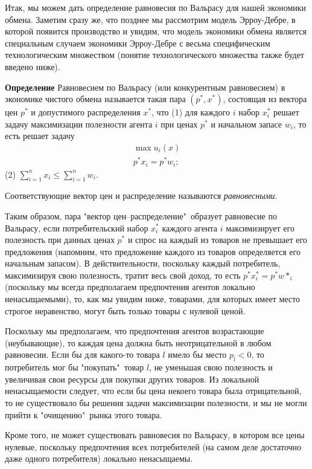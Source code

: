 Итак, мы можем дать определение равновесия по Вальрасу для нашей экономики
обмена. Заметим сразу же, что позднее мы рассмотрим модель
Эрроу-Дебре, в которой появится производство и увидим, что модель экономики
обмена является специальным случаем экономики Эрроу-Дебре с весьма
специфическим технологическим множеством (понятие технологического
множества также будет введено ниже).

\textbf{Определение} Равновесием по Вальрасу (или конкурентным равновесием)
в экономике чистого обмена называется такая пара $(p^*,x^*)$,
состоящая из вектора цен $p^*$ и допустимого распределения $x^*$, что
(1) для каждого $i$ набор $x^*_i$ решает задачу максимизации полезности
агента $i$ при ценах $p^*$ и начальном запасе $w_i$, то есть решает задачу
$$
\begin{array}{c}
\max u_i(x)\\
p^*x_i=p^*w_i;
\end{array}
$$
(2) $ \sum^n_{i=1}x_i\leq\sum^n_{i=1}w_i.$


 Соответствующие вектор цен  и распределение называются \emph{равновесными}.

Таким образом, пара "вектор цен--распределение"\, образует равновесие по Вальрасу, если
потребительский набор $x^*_i$ каждого агента $i$  максимизирует его полезность при
данных ценах $p^*$ и спрос на каждый из товаров не превышает его предложения (напомним,
что предложение каждого из товаров определяется его начальным запасом). В действительности,
поскольку каждый потребитель, максимизируя свою полезность, тратит весь свой доход,
то есть $p^*x^*_i=p^*w*_i$ (поскольку мы всегда предполагаем предпочтения агентов
локально ненасыщаемыми), то, как мы увидим ниже, товарами, для которых имеет место
строгое неравенство, могут быть только товары с нулевой ценой.

Поскольку мы предполагаем, что предпочтения агентов возрастающие (неубывающие), то каждая
цена должна быть неотрицательной в любом равновесии. Если бы для какого-то товара
$l$ имело бы место $p_l<0$, то потребитель мог бы "покупать"\, товар $l$, не уменьшая
свою полезность и увеличивая свои ресурсы для покупки других товаров. Из локальной ненасыщаемости
следует, что если бы  цена некоего товара была отрицательной, то не существовало бы
решения задачи максимизации полезности, и мы не могли прийти к "очищению"\, рынка
этого товара.

Кроме того, не может существовать равновесия по Вальрасу, в котором все цены нулевые,
поскольку предпочтения всех потребителей (на самом деле достаточно даже одного потребителя)
локально ненасыщаемы.

